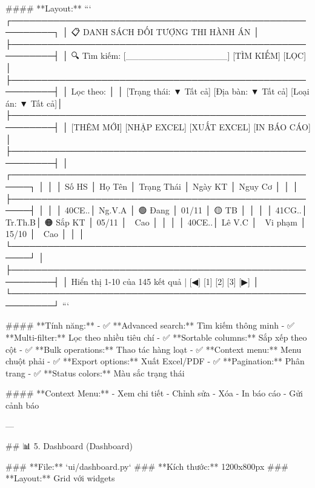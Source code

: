 #### **Layout:**
```
┌─────────────────────────────────────────────────────────┐
│ 📋 DANH SÁCH ĐỐI TƯỢNG THI HÀNH ÁN                    │
├─────────────────────────────────────────────────────────┤
│ 🔍 Tìm kiếm: [________________] [TÌM KIẾM] [LỌC]     │
├─────────────────────────────────────────────────────────┤
│ Lọc theo:                                              │
│ [Trạng thái: ▼ Tất cả] [Địa bàn: ▼ Tất cả] [Loại án: ▼ Tất cả]│
├─────────────────────────────────────────────────────────┤
│ [THÊM MỚI] [NHẬP EXCEL] [XUẤT EXCEL] [IN BÁO CÁO]    │
├─────────────────────────────────────────────────────────┤
│ ┌─────────────────────────────────────────────────────┐ │
│ │ Số HS │ Họ Tên │ Trạng Thái │ Ngày KT │ Nguy Cơ │ │
│ ├─────────────────────────────────────────────────────┤ │
│ │ 40CE..│ Ng.V.A │ 🟢 Đang    │ 01/11   │ 🟡 TB   │ │
│ │ 41CG..│ Tr.Th.B│ 🟠 Sắp KT  │ 05/11   │ 🔴 Cao  │ │
│ │ 40CE..│ Lê V.C │ 🔴 Vi phạm │ 15/10   │ 🔴 Cao  │ │
│ └─────────────────────────────────────────────────────┘ │
├─────────────────────────────────────────────────────────┤
│ Hiển thị 1-10 của 145 kết quả | [◀] [1] [2] [3] [▶]  │
└─────────────────────────────────────────────────────────┘
```

#### **Tính năng:**
- ✅ **Advanced search:** Tìm kiếm thông minh
- ✅ **Multi-filter:** Lọc theo nhiều tiêu chí
- ✅ **Sortable columns:** Sắp xếp theo cột
- ✅ **Bulk operations:** Thao tác hàng loạt
- ✅ **Context menu:** Menu chuột phải
- ✅ **Export options:** Xuất Excel/PDF
- ✅ **Pagination:** Phân trang
- ✅ **Status colors:** Màu sắc trạng thái

#### **Context Menu:**
- Xem chi tiết
- Chỉnh sửa
- Xóa
- In báo cáo
- Gửi cảnh báo

---

## 📊 5. Dashboard (Dashboard)

### **File:** `ui/dashboard.py`
### **Kích thước:** 1200x800px
### **Layout:** Grid với widgets

